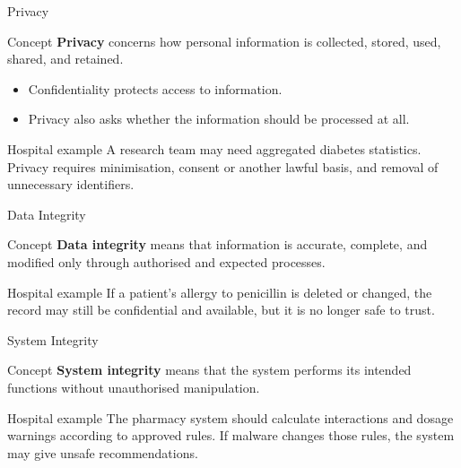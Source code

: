 \documentclass[presentation]{beamer}
\begin{document}
\begin{frame}[c]{Privacy}
\begin{block}{Concept}
\textbf{Privacy} concerns how personal information is collected, stored, used, shared, and retained.
\end{block}

\begin{itemize}
    \item Confidentiality protects access to information.
    \item Privacy also asks whether the information should be processed at all.
\end{itemize}

\begin{exampleblock}{Hospital example}
A research team may need aggregated diabetes statistics. Privacy requires minimisation,
consent or another lawful basis, and removal of unnecessary identifiers.
\end{exampleblock}
\end{frame}

\begin{frame}[c]{Data Integrity}
\begin{block}{Concept}
\textbf{Data integrity} means that information is accurate, complete, and modified only through
authorised and expected processes.
\end{block}

\begin{exampleblock}{Hospital example}
If a patient's allergy to penicillin is deleted or changed, the record may still be confidential
and available, but it is no longer safe to trust.
\end{exampleblock}
\end{frame}

\begin{frame}[c]{System Integrity}
\begin{block}{Concept}
\textbf{System integrity} means that the system performs its intended functions without
unauthorised manipulation.
\end{block}

\begin{exampleblock}{Hospital example}
The pharmacy system should calculate interactions and dosage warnings according to approved
rules. If malware changes those rules, the system may give unsafe recommendations.
\end{exampleblock}
\end{frame}
\end{document}

